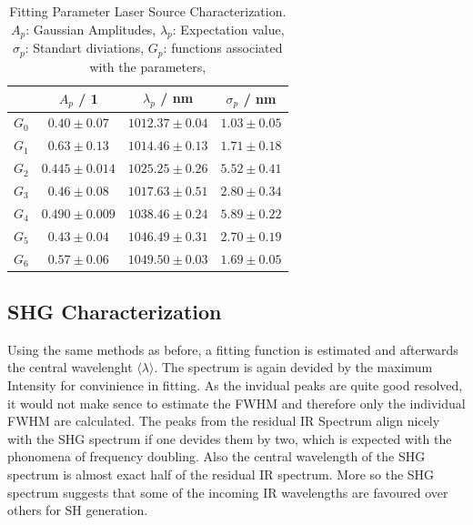 \begin{table}[H]
\centering
\caption{
    Fitting Parameter Laser Source Characterization. \\
    $A_p$: Gaussian Amplitudes,
    $\lambda_p$: Expectation value,
    $\sigma_p$: Standart diviations,
    $G_p$: functions associated with the parameters,
}
\begin{tabular}{c|ccc} \hline
    &  $A_p$ / 1 &  $\lambda_p$ / nm & $\sigma_p$ / nm  \\ \hline  \hline 
$G_0$&$0.40 \pm 0.07$&$1012.37 \pm 0.04$&$1.03 \pm 0.05$\\ \hline
$G_1$&$0.63 \pm 0.13$&$1014.46 \pm 0.13$&$1.71 \pm 0.18$\\ \hline
$G_2$&$0.445 \pm 0.014$&$1025.25 \pm 0.26$&$5.52 \pm 0.41$\\ \hline
$G_3$&$0.46 \pm 0.08$&$1017.63 \pm 0.51$&$2.80 \pm 0.34$\\ \hline
$G_4$&$0.490 \pm 0.009$&$1038.46 \pm 0.24$&$5.89 \pm 0.22$\\ \hline
$G_5$&$0.43 \pm 0.04$&$1046.49 \pm 0.31$&$2.70 \pm 0.19$\\ \hline
$G_6$&$0.57 \pm 0.06$&$1049.50 \pm 0.03$&$1.69 \pm 0.05$\\ \hline
\end{tabular}
\label{tab:evaluation:ir_fitted1}
\end{table}
\newpage
\subsection{SHG Characterization}
Using the same methods as before, a fitting function is estimated and afterwards the central wavelenght $\langle \lambda \rangle$.
The spectrum is again devided by the maximum Intensity for convinience in fitting.
As the invidual peaks are quite good resolved, it would not make sence to estimate the FWHM and therefore only the individual FWHM are calculated.
The peaks from the residual IR Spectrum align nicely with the SHG spectrum if one devides them by two, which is expected with the phonomena of frequency doubling.
Also the central wavelength of the SHG spectrum is almost exact half of the residual IR spectrum.
More so the SHG spectrum suggests that some of the incoming IR wavelengths are favoured over others for SH generation.

